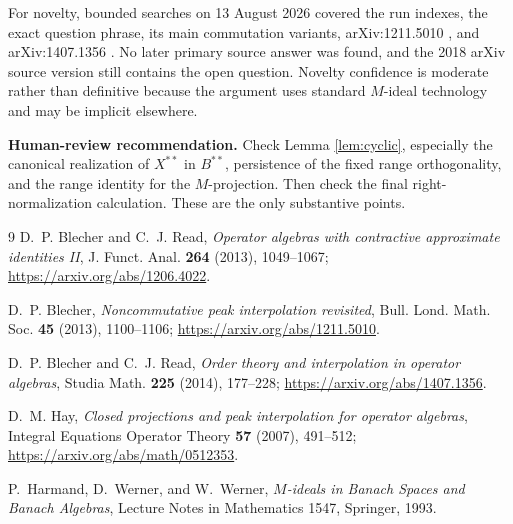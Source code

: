 \documentclass[11pt]{article}
\begin{document}
For novelty, bounded searches on 13 August 2026 covered the run indexes, the
exact question phrase, its main commutation variants, arXiv:1211.5010
\cite{Bnpi}, and arXiv:1407.1356 \cite{BRorder}.  No later primary source
answer was found, and the 2018 arXiv source version still contains the open
question.  Novelty confidence is moderate rather than definitive because the
argument uses standard $M$-ideal technology and may be implicit elsewhere.

\textbf{Human-review recommendation.}  Check Lemma \ref{lem:cyclic}, especially
the canonical realization of $X^{**}$ in $B^{**}$, persistence of the fixed
range orthogonality, and the range identity for the $M$-projection.  Then
check the final right-normalization calculation.  These are the only
substantive points.

\begin{thebibliography}{9}
D.~P. Blecher and C.~J. Read,
\emph{Operator algebras with contractive approximate identities II},
J. Funct. Anal. \textbf{264} (2013), 1049--1067;
\url{https://arxiv.org/abs/1206.4022}.

D.~P. Blecher,
\emph{Noncommutative peak interpolation revisited},
Bull. Lond. Math. Soc. \textbf{45} (2013), 1100--1106;
\url{https://arxiv.org/abs/1211.5010}.

D.~P. Blecher and C.~J. Read,
\emph{Order theory and interpolation in operator algebras},
Studia Math. \textbf{225} (2014), 177--228;
\url{https://arxiv.org/abs/1407.1356}.

D.~M. Hay,
\emph{Closed projections and peak interpolation for operator algebras},
Integral Equations Operator Theory \textbf{57} (2007), 491--512;
\url{https://arxiv.org/abs/math/0512353}.

P.~Harmand, D.~Werner, and W.~Werner,
\emph{$M$-ideals in Banach Spaces and Banach Algebras},
Lecture Notes in Mathematics 1547, Springer, 1993.
\end{thebibliography}
\end{document}
